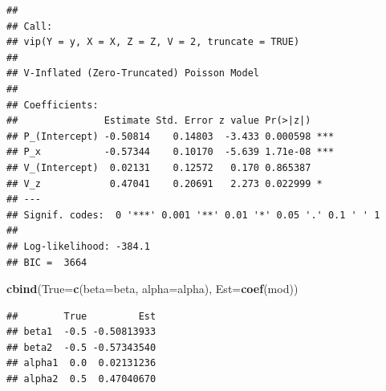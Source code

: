 \documentclass[]{article}
\newenvironment{Shaded}{\begin{snugshade}}{\end{snugshade}}
\newcommand{\KeywordTok}[1]{\textcolor[rgb]{0.13,0.29,0.53}{\textbf{#1}}}
\newcommand{\DataTypeTok}[1]{\textcolor[rgb]{0.13,0.29,0.53}{#1}}
\newcommand{\NormalTok}[1]{#1}
\begin{document}
\begin{verbatim}
## 
## Call:
## vip(Y = y, X = X, Z = Z, V = 2, truncate = TRUE)
## 
## V-Inflated (Zero-Truncated) Poisson Model
## 
## Coefficients:
##               Estimate Std. Error z value Pr(>|z|)    
## P_(Intercept) -0.50814    0.14803  -3.433 0.000598 ***
## P_x           -0.57344    0.10170  -5.639 1.71e-08 ***
## V_(Intercept)  0.02131    0.12572   0.170 0.865387    
## V_z            0.47041    0.20691   2.273 0.022999 *  
## ---
## Signif. codes:  0 '***' 0.001 '**' 0.01 '*' 0.05 '.' 0.1 ' ' 1 
## 
## Log-likelihood: -384.1 
## BIC =  3664
\end{verbatim}

\begin{Shaded}
\begin{Highlighting}[]
\KeywordTok{cbind}\NormalTok{(}\DataTypeTok{True=}\KeywordTok{c}\NormalTok{(}\DataTypeTok{beta=}\NormalTok{beta, }\DataTypeTok{alpha=}\NormalTok{alpha),}
      \DataTypeTok{Est=}\KeywordTok{coef}\NormalTok{(mod))}
\end{Highlighting}
\end{Shaded}

\begin{verbatim}
##        True         Est
## beta1  -0.5 -0.50813933
## beta2  -0.5 -0.57343540
## alpha1  0.0  0.02131236
## alpha2  0.5  0.47040670
\end{verbatim}
\end{document}
